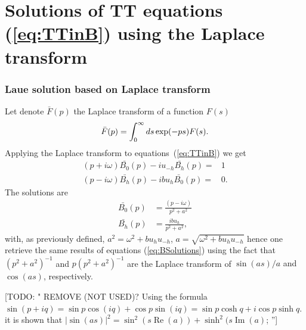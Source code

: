 \documentclass[preprint]{iucr}              %
\newcommand{\todo}[1]{{\color{red}[TODO: "#1'']}}
\newcommand{\inred}[1]{{\color{red}#1}}
\begin{document}
\section{Solutions of TT equations (\ref{eq:TTinB}) using the Laplace transform}
\label{appendix:laplace}


\subsubsection{Laue solution based on Laplace transform}
\label{sec:laplaceLaue}
Let denote $\bar{F}(p)$ the Laplace transform of a function $F(s)$
\begin{equation}
\Bar{F}(p) = \int_0^\infty ds \exp(-p s) F(s).
\end{equation}
Applying the Laplace transform to equations~(\ref{eq:TTinB}) we get
\begin{subequations}
\label{eq:TTlaueLaplace}
\begin{align}
(p + i \omega) \bar{B_0}(p) - i u_{-h} \bar{B_h}(p)= & 1 \\
(p - i \omega) \bar{B_h}(p) - i b u_{h} \bar{B_0}(p)= & 0.
\end{align}
\end{subequations}
The solutions are
\begin{subequations}
\begin{align}
\bar{B_0}(p) &= \frac{(p - i \omega) }{p^2 + a^2} \\
\bar{B_h}(p) &= \frac{i b u_h}{p^2 + a^2},
\end{align}
\end{subequations}
with, \inred{as previously defined,} $a^2=\omega^2 + b u_h u_{-h}$, $a=\sqrt{\omega^2+b u_h u_{-h}}$
hence one retrieve the same results of equations (\ref{eq:BSolutions}) using the fact that  $(p^2+a^2)^{-1}$ and $p(p^2+a^2)^{-1}$ are the Laplace transform of \inred{ $\sin(a s)/a$ and $\cos(a s)$}, respectively. 

\todo{ REMOVE (NOT USED)? Using the formula $\sin(p+i q)=\sin p \cos(i q) + \cos p \sin(i q)=\sin p \cosh q + i \cos p \sinh q$. it is shown that $|\sin(a s)|^2=\sin^2(s \operatorname{Re}(a)) + \sinh^2(s \operatorname{Im}(a)$;
}
\end{document}
